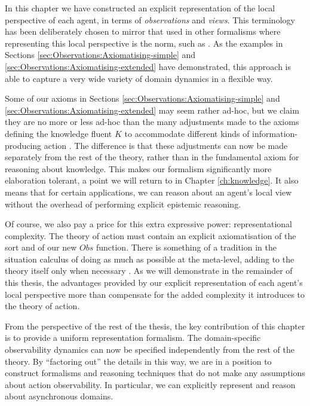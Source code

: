 In this chapter we have constructed an explicit representation of
the local perspective of each agent, in terms of \emph{observations}
and \emph{views}. This terminology has been deliberately chosen to
mirror that used in other formalisms where representing this local
perspective is the norm, such as \citep{parikh85dist_knowledge,halpern90knowledge_distrib}.
As the examples in Sections \ref{sec:Observations:Axiomatising-simple}
and \ref{sec:Observations:Axiomatising-extended} have demonstrated,
this approach is able to capture a very wide variety of domain dynamics
in a flexible way.

Some of our axioms in Sections \ref{sec:Observations:Axiomatising-simple}
and \ref{sec:Observations:Axiomatising-extended} may seem rather
ad-hoc, but we claim they are no more or less ad-hoc than the many
adjustments made to the axioms defining the knowledge fluent $K$
to accommodate different kinds of information-producing action \citep{shapiro98specifying_ma_systems,Lesperance99sitcalc_approach,shapiro01casl_feat_inter,Petrick06thesis,shapiro07sc_goal_change}.
The difference is that these adjustments can now be made separately
from the rest of the theory, rather than in the fundamental axiom
for reasoning about knowledge. This makes our formalism significantly
more elaboration tolerant, a point we will return to in Chapter \ref{ch:knowledge}.
It also means that for certain applications, we can reason about an
agent's local view without the overhead of performing explicit epistemic
reasoning.

Of course, we also pay a price for this extra expressive power: representational
complexity. The theory of action must contain an explicit axiomatisation
of the  sort and of our new $Obs$ function. There
is something of a tradition in the situation calculus of doing as
much as possible at the meta-level, adding to the theory itself only
when necessary \citep{levesque97golog}. As we will demonstrate in
the remainder of this thesis, the advantages provided by our explicit
representation of each agent's local perspective more than compensate
for the added complexity it introduces to the theory of action.

From the perspective of the rest of the thesis, the key contribution
of this chapter is to provide a uniform representation formalism.
The domain-specific observability dynamics can now be specified independently
from the rest of the theory. By {}``factoring out'' the details
in this way, we are in a position to construct formalisms and reasoning
techniques that do not make any assumptions about action observability.
In particular, we can explicitly represent and reason about asynchronous
domains.

